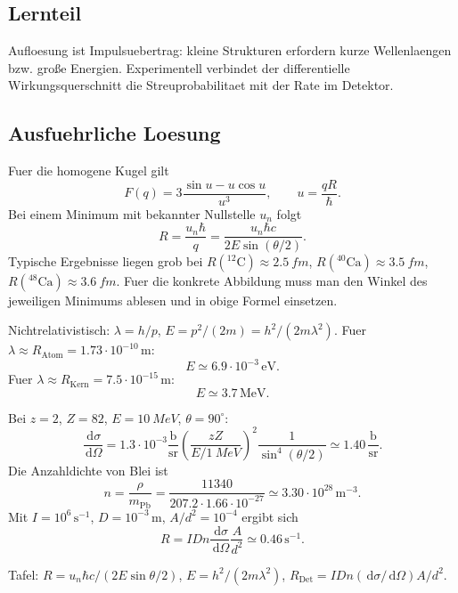 \documentclass[11pt,a4paper]{scrartcl}
\newcommand{\dd}{\,\mathrm{d}}
\newcommand{\diffxs}{\frac{\dd\sigma}{\dd\Omega}}
\begin{document}
\subsection{Lernteil}\begin{learningbox}Aufloesung ist Impulsuebertrag: kleine Strukturen erfordern kurze Wellenlaengen bzw. große Energien. Experimentell verbindet der differentielle Wirkungsquerschnitt die Streuprobabilitaet mit der Rate im Detektor.\end{learningbox}
\subsection{Ausfuehrliche Loesung}
\begin{calculationbox}[title={Kernradien aus Minima}]
Fuer die homogene Kugel gilt
\[F(q)=3\frac{\sin u-u\cos u}{u^3},\qquad u=\frac{qR}{\hbar}.\]
Bei einem Minimum mit bekannter Nullstelle \(u_n\) folgt
\[R=\frac{u_n\hbar}{q}=\frac{u_n\hbar c}{2E\sin(\theta/2)}.\]
Typische Ergebnisse liegen grob bei \(R(^{12}\mathrm C)\approx\SI{2.5}{fm}\), \(R(^{40}\mathrm{Ca})\approx\SI{3.5}{fm}\), \(R(^{48}\mathrm{Ca})\approx\SI{3.6}{fm}\). Fuer die konkrete Abbildung muss man den Winkel des jeweiligen Minimums ablesen und in obige Formel einsetzen.
\end{calculationbox}
\begin{calculationbox}[title={de-Broglie-Aufloesung}]
Nichtrelativistisch: \(\lambda=h/p\), \(E=p^2/(2m)=h^2/(2m\lambda^2)\). Fuer \(\lambda\approx R_{\mathrm{Atom}}=1.73\cdot10^{-10}\,\mathrm m\):
\[E\simeq6.9\cdot10^{-3}\,\mathrm{eV}.\]
Fuer \(\lambda\approx R_{\mathrm{Kern}}=7.5\cdot10^{-15}\,\mathrm m\):
\[E\simeq3.7\,\mathrm{MeV}.\]
\end{calculationbox}
\begin{calculationbox}[title={Rutherford-Zaehlerate}]
Bei \(z=2\), \(Z=82\), \(E=\SI{10}{MeV}\), \(\theta=90^\circ\):
\[\diffxs=1.3\cdot10^{-3}\frac{\mathrm b}{\mathrm{sr}}\left(\frac{zZ}{E/\SI{1}{MeV}}\right)^2\frac{1}{\sin^4(\theta/2)}\simeq1.40\,\frac{\mathrm b}{\mathrm{sr}}.\]
Die Anzahldichte von Blei ist
\[n=\frac{\rho}{m_{\mathrm{Pb}}}=\frac{11340}{207.2\cdot1.66\cdot10^{-27}}\simeq3.30\cdot10^{28}\,\mathrm{m}^{-3}.\]
Mit \(I=10^6\,\mathrm{s}^{-1}\), \(D=10^{-3}\,\mathrm m\), \(A/d^2=10^{-4}\) ergibt sich
\[R=I D n\diffxs\frac{A}{d^2}\simeq0.46\,\mathrm{s}^{-1}.\]
\end{calculationbox}
\begin{talkbox}Tafel: \(R=u_n\hbar c/(2E\sin\theta/2)\), \(E=h^2/(2m\lambda^2)\), \(R_{\mathrm{Det}}=IDn(\dd\sigma/\dd\Omega)A/d^2\).\end{talkbox}
\end{document}
